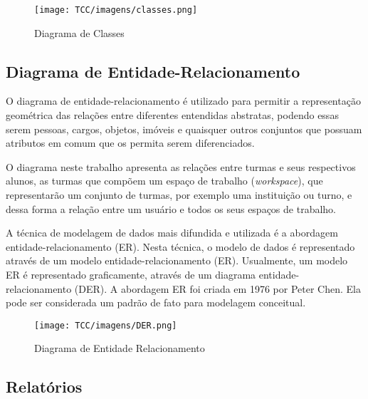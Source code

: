 \begin{figure}[H]
     \centering
     \texttt{[image: TCC/imagens/classes.png]}
     \caption{Diagrama de Classes}
     \label{Diagrama de Classes}
\end{figure}


\subsection{Diagrama de Entidade-Relacionamento}

O diagrama de entidade-relacionamento é utilizado para permitir a representação geométrica das relações entre diferentes entendidas abstratas, podendo essas serem pessoas, cargos, objetos, imóveis e quaisquer outros conjuntos que possuam atributos em comum que os permita serem diferenciados.

O diagrama neste trabalho apresenta as relações entre turmas e seus respectivos alunos, as turmas que compõem um espaço de trabalho (\textit{workspace}), que representarão um conjunto de turmas,  por exemplo uma instituição ou turno, e dessa forma a relação entre um usuário e todos os seus espaços de trabalho.

  \begin{citacao}
   A técnica de modelagem de dados mais difundida e utilizada é a abordagem entidade-relacionamento (ER). Nesta técnica, o modelo de dados é representado através de um modelo entidade-relacionamento (ER). Usualmente, um modelo ER é representado graficamente, através de um diagrama entidade-relacionamento (DER). A abordagem ER foi criada em 1976 por Peter Chen. Ela pode ser considerada um padrão de fato para modelagem conceitual. \cite[p. 12]{heuser09}
    \end{citacao}
    
\begin{figure}[!h]
     \centering
     \texttt{[image: TCC/imagens/DER.png]}
     \caption{Diagrama de Entidade Relacionamento}
     \label{Diagrama de Entidade Relacionamento}
\end{figure}
 

\subsection{Relatórios}

